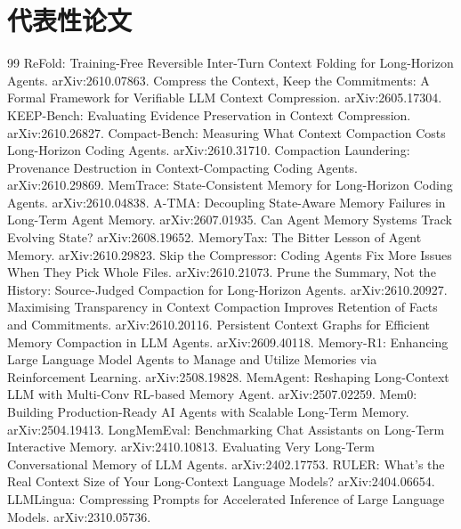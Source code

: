 \documentclass[11pt,a4paper]{ctexart}
\begin{document}
\section{代表性论文}
\begin{thebibliography}{99}
 ReFold: Training-Free Reversible Inter-Turn Context Folding for Long-Horizon Agents. arXiv:2610.07863.
 Compress the Context, Keep the Commitments: A Formal Framework for Verifiable LLM Context Compression. arXiv:2605.17304.
 KEEP-Bench: Evaluating Evidence Preservation in Context Compression. arXiv:2610.26827.
 Compact-Bench: Measuring What Context Compaction Costs Long-Horizon Coding Agents. arXiv:2610.31710.
 Compaction Laundering: Provenance Destruction in Context-Compacting Coding Agents. arXiv:2610.29869.
 MemTrace: State-Consistent Memory for Long-Horizon Coding Agents. arXiv:2610.04838.
 A-TMA: Decoupling State-Aware Memory Failures in Long-Term Agent Memory. arXiv:2607.01935.
 Can Agent Memory Systems Track Evolving State? arXiv:2608.19652.
 MemoryTax: The Bitter Lesson of Agent Memory. arXiv:2610.29823.
 Skip the Compressor: Coding Agents Fix More Issues When They Pick Whole Files. arXiv:2610.21073.
 Prune the Summary, Not the History: Source-Judged Compaction for Long-Horizon Agents. arXiv:2610.20927.
 Maximising Transparency in Context Compaction Improves Retention of Facts and Commitments. arXiv:2610.20116.
 Persistent Context Graphs for Efficient Memory Compaction in LLM Agents. arXiv:2609.40118.
 Memory-R1: Enhancing Large Language Model Agents to Manage and Utilize Memories via Reinforcement Learning. arXiv:2508.19828.
 MemAgent: Reshaping Long-Context LLM with Multi-Conv RL-based Memory Agent. arXiv:2507.02259.
 Mem0: Building Production-Ready AI Agents with Scalable Long-Term Memory. arXiv:2504.19413.
 LongMemEval: Benchmarking Chat Assistants on Long-Term Interactive Memory. arXiv:2410.10813.
 Evaluating Very Long-Term Conversational Memory of LLM Agents. arXiv:2402.17753.
 RULER: What's the Real Context Size of Your Long-Context Language Models? arXiv:2404.06654.
 LLMLingua: Compressing Prompts for Accelerated Inference of Large Language Models. arXiv:2310.05736.
\end{thebibliography}
\end{document}
